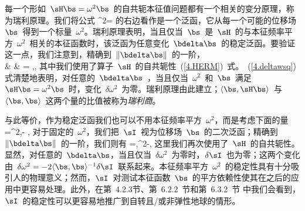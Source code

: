 每一个形如~$\sH\bs=\omega^2\bs$~的自共轭本征值问题都有一个相关的变分原理，称为瑞利原理。我们将公式
\eq
\label{4.Rayquo2}
\omega^2=\frac{\langle\bs,\sH\bs\rangle}{\langle\bs,\bs\rangle}
\en
的右边看作是一个泛函，它从每一个可能的位移场~$\bs$~得到一个标量~$\omega^2$。瑞利原理表明，当且仅当~$\bs$~是~$\sH$~的与本征频率平方~$\omega^2$~相关的本征函数时，该泛函为任意变化~$\bdelta\bs$~的稳定泛函。要验证这一点，我们注意到，精确到~$\|\bdelta\bs\|$~的一阶，
\eqa
\label{4.deltawsq}
 \nonumber \\
& & =\frac{2\langle\bdelta\bs,\sH\bs-\omega^2\bs\rangle}
{\langle\bs,\bs\rangle},
\ena
其中我们使用了算子~$\sH$~的自共轭性~(\ref{4.HERM})~式。~(\ref{4.deltawsq})式清楚地表明，对任意的~$\bdelta\bs$~，当且仅当~$\omega^2$~和~$\bs$~满足~$\sH\bs=\omega^2\bs$~时，变化~$\delta\omega^2$~为零。瑞利原理由此建立；$\langle\bs,\sH\bs\rangle$~与~$\langle\bs,\bs\rangle$~这两个量的比值被称为{\em 瑞利商\/}。
%

与此等价，作为稳定泛函我们也可以不用本征频率平方~$\omega^2$，而是考虑下面的量
\eq
\label{4.firstact}
\sI=\half\omega^2\langle\bs,\bs\rangle-\half\langle
\bs,\sH\bs\rangle
\en
对于固定的~$\omega^2$，我们把~$\sI$~视为位移场~$\bs$~的二次泛函；精确到~$\|\bdelta\bs\|$~的一阶，我们则有
\eq
\label{4.firstdI}
\delta\sI=\langle\bdelta\bs,\omega^2\bs-\sH\bs\rangle,
\en
这里我们再次使用了~$\sH$~的自共轭性。显然，对任意的~$\bdelta\bs$，当且仅当~$\delta\omega^2$~为零时，$\delta\sI$~也为零；这两个变化由~$\delta\omega^2=-2\langle\bs,\bs\rangle^{-1}\delta\sI$~联系起来。本征频率平方~$\omega^2$~的稳定性具有十分吸引人的物理意义；然而，$\sI$~对测试本征函数~$\bs$~的平方依赖性使其在之后的应用中更容易处理。此外，在第~4.2.3节、第~6.2.2~节和第~6.3.2~节 中我们会看到，$\sI$~的稳定性可以更容易地推广到自转且/或非弹性地球的情形。

